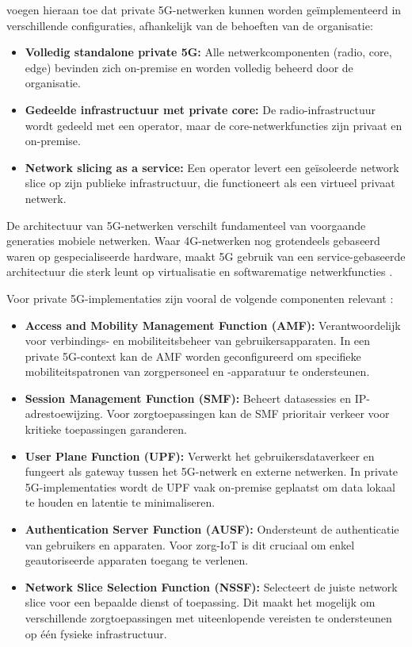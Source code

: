 \autocite{Wen2021} voegen hieraan toe dat private 5G-netwerken kunnen worden geïmplementeerd in verschillende configuraties, afhankelijk van de behoeften van de organisatie:
\begin{itemize}
	\item \textbf{Volledig standalone private 5G:} Alle netwerkcomponenten (radio, core, edge) bevinden zich on-premise en worden volledig beheerd door de organisatie.
	\item \textbf{Gedeelde infrastructuur met private core:} De radio-infrastructuur wordt gedeeld met een operator, maar de core-netwerkfuncties zijn privaat en on-premise.
	\item \textbf{Network slicing as a service:} Een operator levert een geïsoleerde network slice op zijn publieke infrastructuur, die functioneert als een virtueel privaat netwerk.
\end{itemize}
\vspace{0.5cm}

De architectuur van 5G-netwerken verschilt fundamenteel van voorgaande generaties mobiele netwerken. Waar 4G-netwerken nog grotendeels gebaseerd waren op gespecialiseerde hardware, maakt 5G gebruik van een service-gebaseerde architectuur die sterk leunt op virtualisatie en softwarematige netwerkfuncties \autocite{3GPP2024}.
\vspace{0.5cm}

Voor private 5G-implementaties zijn vooral de volgende componenten relevant \autocite{3GPP2024}:

\begin{itemize}
	\item \textbf{Access and Mobility Management Function (AMF):} Verantwoordelijk voor verbindings- en mobiliteitsbeheer van gebruikersapparaten. In een private 5G-context kan de AMF worden geconfigureerd om specifieke mobiliteitspatronen van zorgpersoneel en -apparatuur te ondersteunen.
	\item \textbf{Session Management Function (SMF):} Beheert datasessies en IP-adrestoewijzing. Voor zorgtoepassingen kan de SMF prioritair verkeer voor kritieke toepassingen garanderen.
	\item \textbf{User Plane Function (UPF):} Verwerkt het gebruikersdataverkeer en fungeert als gateway tussen het 5G-netwerk en externe netwerken. In private 5G-implementaties wordt de UPF vaak on-premise geplaatst om data lokaal te houden en latentie te minimaliseren.
	\item \textbf{Authentication Server Function (AUSF):} Ondersteunt de authenticatie van gebruikers en apparaten. Voor zorg-IoT is dit cruciaal om enkel geautoriseerde apparaten toegang te verlenen.
	\item \textbf{Network Slice Selection Function (NSSF):} Selecteert de juiste network slice voor een bepaalde dienst of toepassing. Dit maakt het mogelijk om verschillende zorgtoepassingen met uiteenlopende vereisten te ondersteunen op één fysieke infrastructuur.
\end{itemize}
\vspace{0.5cm}

